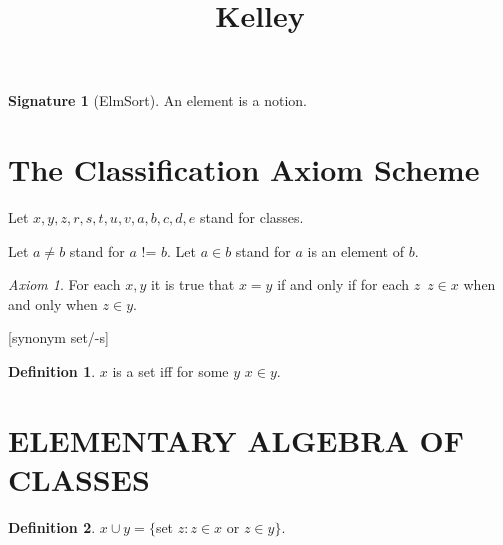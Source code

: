 \documentclass[a4paper,draft]{amsproc}
\title{\textbf{Kelley}}
\date{}
\begin{document}
\theoremstyle{plain}
 \newtheorem{theorem}{Theorem}[section]
 \newtheorem{lemma}{Theorem}[section]
 \newtheorem{proposition}{Theorem}[section]
\theoremstyle{definition}
 \newtheorem{example}{Example}[section]
 \newtheorem{definition}{Definition}[section]
 \newtheorem{signature}{Signature}[section]
\theoremstyle{remark}
 \newtheorem{remark}{Remark}[section]
 \newtheorem{notation}{Notation}[section]
\theoremstyle{axiom}
 \newtheorem{axiom}{Axiom}[section]

\newenvironment{forthel}{}{}
\maketitle


\begin{forthel}
[synonym element/-s]

\begin{signature}[ElmSort]
An element is a notion.
\end{signature}

\section{The Classification Axiom Scheme}

Let $x, y, z, r, s, t, u, v, a, b, c, d, e$ stand for classes.

Let $a \neq b$ stand for $a$ != $b$.
Let $a \in b$ stand for $a$ is an element of $b$.

\begin{axiom} For each $x, y$  
it is true that $x = y$ if and only if for each $z$\ $z \in x$ 
when and only when $z \in y$.
\end{axiom}


[synonym set/-s]

\begin{definition} 
$x$ is a set iff for some $y$ $x \in y$.
\end{definition}

\section{ELEMENTARY ALGEBRA OF CLASSES}

\begin{definition} 
$x \cup y = \{$set $z : z \in x$ or $z \in y \}$.
\end{definition}


\end{forthel}
\end{document}
